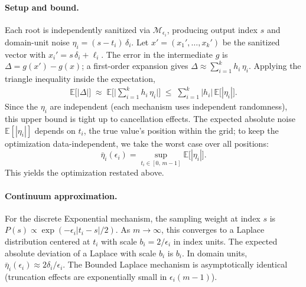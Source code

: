 \paragraph{Setup and bound.} Each root is independently sanitized via $\mathcal{M}_{\epsilon_i}$, producing output index $s$ and domain-unit noise $\eta_i = (s - t_i)\,\delta_i$. Let $x' = (x_1', \dots, x_k')$ be the sanitized vector with $x_i' = s\,\delta_i + \ell_i$. The error in the intermediate $g$ is $\Delta = g(x') - g(x)$; a first-order expansion gives $\Delta \approx \sum_{i=1}^{k} h_i\,\eta_i$. Applying the triangle inequality inside the expectation,
\begin{align*}
    \mathbb{E}\big[|\Delta|\big]
    \;\approx\; \mathbb{E}\Big[\Big|\sum_{i=1}^k h_i\,\eta_i\Big|\Big]
    \;\leq\; \sum_{i=1}^k |h_i|\,\mathbb{E}\big[|\eta_i|\big].
\end{align*}
Since the $\eta_i$ are independent (each mechanism uses independent randomness), this upper bound is tight up to cancellation effects. The expected absolute noise $\mathbb{E}[|\eta_i|]$ depends on $t_i$, the true value's position within the grid; to keep the optimization data-independent, we take the worst case over all positions:
\begin{equation}
\label{eq:bar-eta}
    \bar{\eta}_i(\epsilon_i) = \sup_{t_i \in [0,\, m-1]} \mathbb{E}\big[|\eta_i|\big].
\end{equation}
This yields the optimization restated above.
 
\paragraph{Continuum approximation.} For the discrete Exponential mechanism, the sampling weight at index $s$ is $P(s) \propto \exp(-\epsilon_i |t_i - s|/2)$. As $m \to \infty$, this converges to a Laplace distribution centered at $t_i$ with scale $b_i = 2/\epsilon_i$ in index units. The expected absolute deviation of a Laplace with scale $b_i$ is $b_i$. In domain units, $\bar{\eta}_i(\epsilon_i) \approx 2\delta_i / \epsilon_i$. The Bounded Laplace mechanism is asymptotically identical (truncation effects are exponentially small in $\epsilon_i (m{-}1)$).
 
